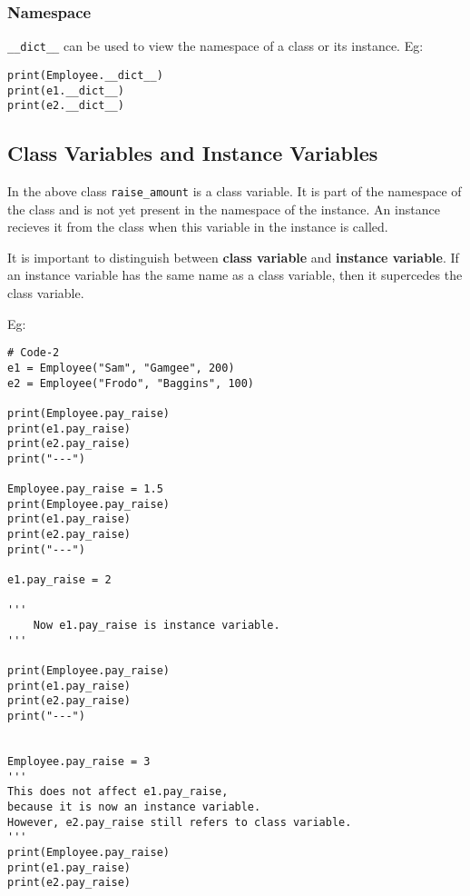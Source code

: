 \subsubsection*{Namespace}

\texttt{\_\_dict\_\_} can be used to view the namespace of a class or its instance. Eg:\\
\begin{verbatim}
print(Employee.__dict__)
print(e1.__dict__)
print(e2.__dict__)
\end{verbatim}

\subsection*{Class Variables and Instance Variables}


In the above class \texttt{raise\_amount} is a class variable. It is part of the namespace of the class and is not yet present in the namespace of the instance. An instance recieves it from the class when this variable in the instance is called.

It is important to distinguish between \textbf{class variable} and \textbf{instance variable}. If an instance variable has the same name as a class variable, then it supercedes the class variable.

\vfill\null
\columnbreak

Eg:\\

\begin{mdframed}[backgroundcolor=gray!10,linecolor=Firebrick4]
\begin{verbatim}
# Code-2
e1 = Employee("Sam", "Gamgee", 200)
e2 = Employee("Frodo", "Baggins", 100)

print(Employee.pay_raise)
print(e1.pay_raise)
print(e2.pay_raise)
print("---")

Employee.pay_raise = 1.5
print(Employee.pay_raise)
print(e1.pay_raise)
print(e2.pay_raise)
print("---")

e1.pay_raise = 2

'''
    Now e1.pay_raise is instance variable.
'''

print(Employee.pay_raise)
print(e1.pay_raise)
print(e2.pay_raise)
print("---")


Employee.pay_raise = 3
'''
This does not affect e1.pay_raise, 
because it is now an instance variable.
However, e2.pay_raise still refers to class variable.
'''
print(Employee.pay_raise)
print(e1.pay_raise)
print(e2.pay_raise)
\end{verbatim}
\end{mdframed}

